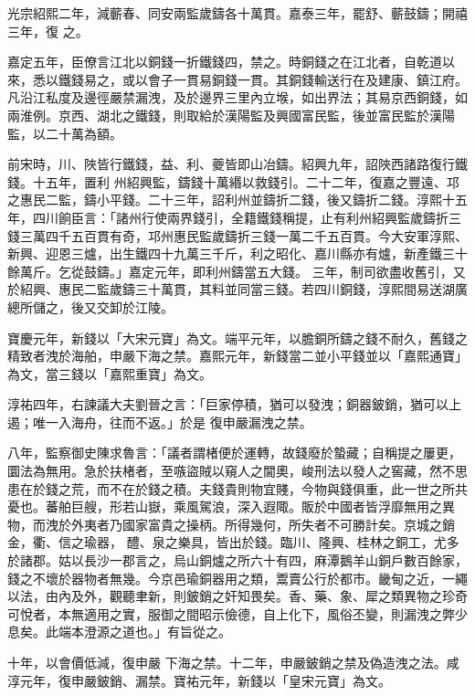 \begin{pinyinscope}
 光宗紹熙二年，減蘄春、同安兩監歲鑄各十萬貫。嘉泰三年，罷舒、蘄鼓鑄；開禧三年，復
 之。



 嘉定五年，臣僚言江北以銅錢一折鐵錢四，禁之。時銅錢之在江北者，自乾道以來，悉以鐵錢易之，或以會子一貫易銅錢一貫。其銅錢輸送行在及建康、鎮江府。凡沿江私度及邊徑嚴禁漏洩，及於邊界三里內立堠，如出界法；其易京西銅錢，如兩淮例。京西、湖北之鐵錢，則取給於漢陽監及興國富民監，後並富民監於漢陽監，以二十萬為額。



 前宋時，川、陜皆行鐵錢，益、利、夔皆即山冶鑄。紹興九年，詔陜西諸路復行鐵錢。十五年，置利
 州紹興監，鑄錢十萬緡以救錢引。二十二年，復嘉之豐遠、邛之惠民二監，鑄小平錢。二十三年，詔利州並鑄折二錢，後又鑄折二錢。淳熙十五年，四川餉臣言：「諸州行使兩界錢引，全籍鐵錢稱提，止有利州紹興監歲鑄折三錢三萬四千五百貫有奇，邛州惠民監歲鑄折三錢一萬二千五百貫。今大安軍淳熙、新興、迎恩三爐，出生鐵四十九萬三千斤，利之昭化、嘉川縣亦有爐，新產鐵三十餘萬斤。乞從鼓鑄。」嘉定元年，即利州鑄當五大錢。
 三年，制司欲盡收舊引，又於紹興、惠民二監歲鑄三十萬貫，其料並同當三錢。若四川銅錢，淳熙間易送湖廣總所儲之，後又交卸於江陵。



 寶慶元年，新錢以「大宋元寶」為文。端平元年，以膽銅所鑄之錢不耐久，舊錢之精致者洩於海舶，申嚴下海之禁。嘉熙元年，新錢當二並小平錢並以「嘉熙通寶」為文，當三錢以「嘉熙重寶」為文。



 淳祐四年，右諫議大夫劉晉之言：「巨家停積，猶可以發洩；銅器鈹銷，猶可以上遏；唯一入海舟，往而不返。」於是
 復申嚴漏洩之禁。



 八年，監察御史陳求魯言：「議者謂楮便於運轉，故錢廢於蟄藏；自稱提之屢更，圜法為無用。急於扶楮者，至嗾盜賊以窺人之閫奧，峻刑法以發人之窖藏，然不思患在於錢之荒，而不在於錢之積。夫錢貴則物宜賤，今物與錢俱重，此一世之所共憂也。蕃舶巨艘，形若山嶽，乘風駕浪，深入遐陬。販於中國者皆浮靡無用之異物，而洩於外夷者乃國家富貴之操柄。所得幾何，所失者不可勝計矣。京城之銷金，衢、信之瑜器，
 醴、泉之樂具，皆出於錢。臨川、隆興、桂林之銅工，尤多於諸郡。姑以長沙一郡言之，烏山銅爐之所六十有四，麻潭鵝羊山銅戶數百餘家，錢之不壞於器物者無幾。今京邑瑜銅器用之類，鬻賣公行於都市。畿甸之近，一繩以法，由內及外，觀聽聿新，則鈹銷之奸知畏矣。香、藥、象、犀之類異物之珍奇可悅者，本無適用之實，服御之間昭示儉德，自上化下，風俗丕變，則漏洩之弊少息矣。此端本澄源之道也。」有旨從之。



 十年，以會價低減，復申嚴
 下海之禁。十二年，申嚴鈹銷之禁及偽造洩之法。咸淳元年，復申嚴鈹銷、漏禁。寶祐元年，新錢以「皇宋元寶」為文。



\end{pinyinscope}